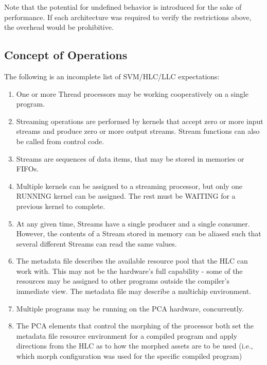 Note that the potential for undefined behavior is introduced for the
sake of performance.  If each architecture was required to verify the
restrictions above, the overhead would be prohibitive.

\subsection{Concept of Operations}

The following is an incomplete list of SVM/HLC/LLC expectations:

\renewcommand{\labelenumi}{\theenumi.}

\begin{enumerate}

\item One or more Thread processors may be working cooperatively on a
single program.

\item Streaming operations are performed by kernels that accept zero
or more input streams and produce zero or more output streams.  Stream
functions can also be called from control code.

\item Streams are sequences of data items, that may be stored in
memories or FIFOs.

\item Multiple kernels can be assigned to a streaming processor, but
only one RUNNING kernel can be assigned.  The rest must be WAITING for
a previous kernel to complete.

\item At any given time, Streams have a single producer and a single
consumer.  However, the contents of a Stream stored in memory can be
aliased such that several different Streams can read the same values.

\item The metadata file describes the available resource pool that the
HLC can work with.  This may not be the hardware's full capability -
some of the resources may be assigned to other programs outside the
compiler's immediate view.  The metadata file may describe a multichip
environment.

\item Multiple programs may be running on the PCA hardware,
concurrently.

\item The PCA elements that control the morphing of the processor both
set the metadata file resource environment for a compiled program and
apply directions from the HLC as to how the morphed assets are to be
used (i.e., which morph configuration was used for the specific
compiled program)


\end{enumerate}
